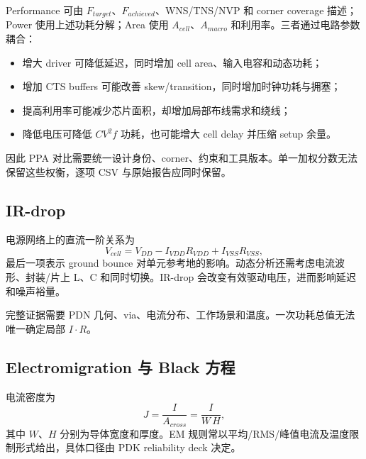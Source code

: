 \documentclass[UTF8,a4paper,11pt,fontset=fandol]{ctexart}
\numberwithin{equation}{section}
\begin{document}
Performance 可由 $F_{target}$、$F_{achieved}$、WNS/TNS/NVP 和 corner coverage 描述；Power 使用上述功耗分解；Area 使用 $A_{cell}$、$A_{macro}$ 和利用率。三者通过电路参数耦合：
\begin{itemize}
  \item 增大 driver 可降低延迟，同时增加 cell area、输入电容和动态功耗；
  \item 增加 CTS buffers 可能改善 skew/transition，同时增加时钟功耗与拥塞；
  \item 提高利用率可能减少芯片面积，却增加局部布线需求和绕线；
  \item 降低电压可降低 $CV^2f$ 功耗，也可能增大 cell delay 并压缩 setup 余量。
\end{itemize}
因此 PPA 对比需要统一设计身份、corner、约束和工具版本。单一加权分数无法保留这些权衡，逐项 CSV 与原始报告应同时保留。

\subsection{IR-drop}

电源网络上的直流一阶关系为
\begin{equation}
V_{cell}=V_{DD}-I_{VDD}R_{VDD}+I_{VSS}R_{VSS},
\end{equation}
最后一项表示 ground bounce 对单元参考地的影响。动态分析还需考虑电流波形、封装/片上 L、C 和同时切换。IR-drop 会改变有效驱动电压，进而影响延迟和噪声裕量\cite{weste,enics}。

完整证据需要 PDN 几何、via、电流分布、工作场景和温度。一次功耗总值无法唯一确定局部 $I\cdot R$。

\subsection{Electromigration 与 Black 方程}

电流密度为
\begin{equation}
J=\frac{I}{A_{cross}}=\frac{I}{W\,H},
\end{equation}
其中 $W$、$H$ 分别为导体宽度和厚度。EM 规则常以平均/RMS/峰值电流及温度限制形式给出，具体口径由 PDK reliability deck 决定。
\end{document}
